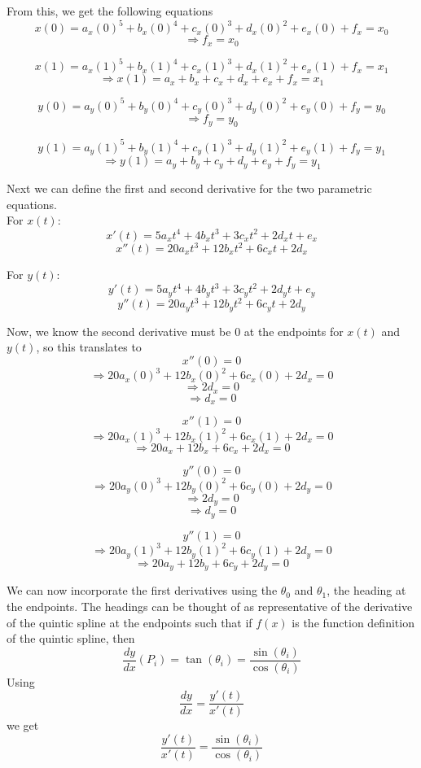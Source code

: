 \documentclass[12pt, letterpaper]{article}
\begin{document}
From this, we get the following equations 
\[x(0) = a_x (0)^5 + b_x (0)^4 + c_x (0)^3 + d_x (0)^2 + e_x (0) + f_x = x_0\]
\begin{equation}
\boxed{\Rightarrow f_x = x_0}
\end{equation}

\[x(1) = a_x (1)^5 + b_x (1)^4 + c_x (1)^3 + d_x (1)^2 + e_x (1) + f_x = x_1\]
\[\Rightarrow x(1) = a_x + b_x + c_x + d_x + e_x + f_x = x_1\]

\[y(0) = a_y (0)^5 + b_y (0)^4 + c_y (0)^3 + d_y (0)^2 + e_y (0) + f_y = y_0\]
\begin{equation}
\boxed{\Rightarrow f_y = y_0}
\end{equation}

\[y(1) = a_y (1)^5 + b_y (1)^4 + c_y (1)^3 + d_y (1)^2 + e_y (1) + f_y = y_1\]
\[\Rightarrow y(1) = a_y + b_y + c_y + d_y + e_y + f_y = y_1\]

Next we can define the first and second derivative for the two parametric equations. \\
For $x(t)$: 
\[x'(t) = 5a_xt^4 + 4b_xt^3 + 3c_xt^2 + 2d_xt + e_x\]
\[x''(t) = 20a_xt^3 + 12b_xt^2 + 6c_xt + 2d_x\]

For $y(t)$: 
\[y'(t) = 5a_yt^4 + 4b_yt^3 + 3c_yt^2 + 2d_yt + e_y\]
\[y''(t) = 20a_yt^3 + 12b_yt^2 + 6c_yt + 2d_y\]


Now, we know the second derivative must be $0$ at the endpoints for $x(t)$ and $y(t)$, so this translates to 
\[x''(0) = 0\]
\[\Rightarrow 20a_x(0)^3 + 12b_x(0)^2 + 6c_x(0) + 2d_x = 0\]
\[\Rightarrow 2d_x = 0\]
\begin{equation}
\boxed{\Rightarrow d_x = 0}
\end{equation}

\[x''(1) = 0\]
\[\Rightarrow 20a_x(1)^3 + 12b_x(1)^2 + 6c_x(1) + 2d_x = 0\]
\[\Rightarrow 20a_x + 12b_x + 6c_x + 2d_x = 0\]

\[y''(0) = 0\]
\[\Rightarrow 20a_y(0)^3 + 12b_y(0)^2 + 6c_y(0) + 2d_y = 0\]
\[\Rightarrow 2d_y = 0\]
\begin{equation}
\boxed{\Rightarrow d_y = 0}
\end{equation}

\[y''(1) = 0\]
\[\Rightarrow 20a_y(1)^3 + 12b_y(1)^2 + 6c_y(1) + 2d_y = 0\]
\[\Rightarrow 20a_y + 12b_y + 6c_y + 2d_y = 0\]

We can now incorporate the first derivatives using the $\theta_0$ and $\theta_1$, the heading at the endpoints. The headings can be thought of as representative of the derivative of the quintic spline at the endpoints such that if $f(x)$ is the function definition of the quintic spline, then \[\frac{dy}{dx}(P_i) = \tan(\theta_i) = \frac{\sin(\theta_i)}{\cos(\theta_i)}\] Using \[\frac{dy}{dx} = \frac{y'(t)}{x'(t)}\] we get \[\frac{y'(t)}{x'(t)} = \frac{\sin(\theta_i)}{\cos(\theta_i)}\]
\end{document}
